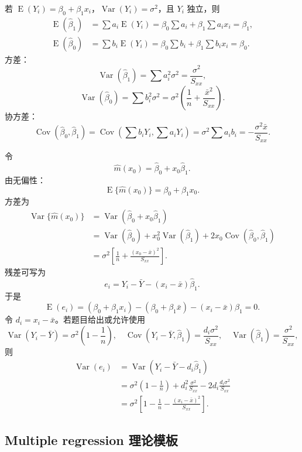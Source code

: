 \documentclass[11pt,a4paper]{article}
\newcommand{\E}{\operatorname{E}}
\newcommand{\Var}{\operatorname{Var}}
\newcommand{\Cov}{\operatorname{Cov}}
\begin{document}
\begin{proofbox}
若 $\E(Y_i)=\beta_0+\beta_1x_i$，$\Var(Y_i)=\sigma^2$，且 $Y_i$ 独立，则
\[
\begin{aligned}
  \E(\hat\beta_1)
  &=
  \sum a_i\E(Y_i)
  =
  \beta_0\sum a_i+\beta_1\sum a_ix_i
  =
  \beta_1,\\
  \E(\hat\beta_0)
  &=
  \sum b_i\E(Y_i)
  =
  \beta_0\sum b_i+\beta_1\sum b_ix_i
  =
  \beta_0.
\end{aligned}
\]
方差：
\[
  \Var(\hat\beta_1)
  =
  \sum a_i^2\sigma^2
  =
  \frac{\sigma^2}{S_{xx}},
\]
\[
  \Var(\hat\beta_0)
  =
  \sum b_i^2\sigma^2
  =
  \sigma^2\left(\frac1n+\frac{\bar x^2}{S_{xx}}\right).
\]
协方差：
\[
  \Cov(\hat\beta_0,\hat\beta_1)
  =
  \Cov\left(\sum b_iY_i,\sum a_iY_i\right)
  =
  \sigma^2\sum a_ib_i
  =
  -\frac{\sigma^2\bar x}{S_{xx}}.
\]
\end{proofbox}

\begin{proofbox}[拟合均值和残差方差]
令
\[
  \hat m(x_0)=\hat\beta_0+x_0\hat\beta_1.
\]
由无偏性：
\[
  \E\{\hat m(x_0)\}=\beta_0+\beta_1x_0.
\]
方差为
\[
\begin{aligned}
  \Var\{\hat m(x_0)\}
  &=
  \Var(\hat\beta_0+x_0\hat\beta_1)\\
  &=
  \Var(\hat\beta_0)+x_0^2\Var(\hat\beta_1)
  +2x_0\Cov(\hat\beta_0,\hat\beta_1)\\
  &=
  \sigma^2\left[
    \frac1n+\frac{(x_0-\bar x)^2}{S_{xx}}
  \right].
\end{aligned}
\]
残差可写为
\[
  e_i=Y_i-\bar Y-(x_i-\bar x)\hat\beta_1.
\]
于是
\[
  \E(e_i)=
  (\beta_0+\beta_1x_i)-(\beta_0+\beta_1\bar x)-(x_i-\bar x)\beta_1=0.
\]
令 $d_i=x_i-\bar x$。若题目给出或允许使用
\[
  \Var(Y_i-\bar Y)=\sigma^2\left(1-\frac1n\right),
  \quad
  \Cov(Y_i-\bar Y,\hat\beta_1)=\frac{d_i\sigma^2}{S_{xx}},
  \quad
  \Var(\hat\beta_1)=\frac{\sigma^2}{S_{xx}},
\]
则
\[
\begin{aligned}
  \Var(e_i)
  &=
  \Var(Y_i-\bar Y-d_i\hat\beta_1)\\
  &=
  \sigma^2\left(1-\frac1n\right)
  +d_i^2\frac{\sigma^2}{S_{xx}}
  -2d_i\frac{d_i\sigma^2}{S_{xx}}\\
  &=
  \boxed{
  \sigma^2\left[
    1-\frac1n-\frac{(x_i-\bar x)^2}{S_{xx}}
  \right]}.
\end{aligned}
\]
\end{proofbox}

\subsection{Multiple regression 理论模板}
\end{document}
